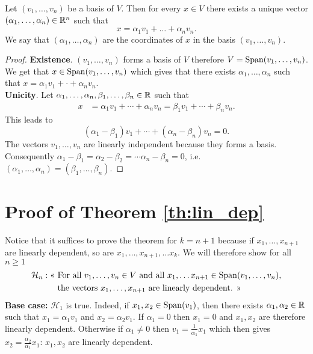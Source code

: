 \documentclass[11pt,nocut]{article}
\begin{document}
\begin{proposition}[Coordinates]
	Let $(v_1, \dots, v_n)$ be a basis of $V$. Then for every $x \in V$ there exists a unique vector $(\alpha_1, \dots, \alpha_n) \in \mathbb{R}^n$ such that
	$$
	x = \alpha_1 v_1 + \dots + \alpha_n v_n.
	$$
	We say that $(\alpha_1, \dots, \alpha_n)$ are the coordinates of $x$ in the basis $(v_1, \dots, v_n)$.
\end{proposition}
\begin{proof}
	\textbf{Existence}. $(v_1, \dots, v_n)$ forms a basis of $V$ therefore  $V = {{\rm Span}}(v_1, \dots, v_n)$. We get that $x \in {{\rm Span}}(v_1, \dots, v_n)$ which gives that there exists $\alpha_1, \dots, \alpha_n$ such that $x = \alpha_1 v_1 + \cdot + \alpha_n v_n$.
	\\
	\textbf{Unicity}. Let $\alpha_1, \dots, \alpha_n, \beta_1, \dots, \beta_n \in \mathbb{R}$ such that
	\begin{align*}
		x &= \alpha_1 v_1 + \cdots + \alpha_n v_n = \beta_1 v_1 + \cdots + \beta_n v_n.
	\end{align*}
	This leads to
	$$
	(\alpha_1 - \beta_1) v_1 + \cdots + (\alpha_n - \beta_n) v_n = 0.
	$$
	The vectors $v_1, \dots, v_n$ are linearly independent because they forms a basis. Consequently $\alpha_1 - \beta_1 = \alpha_2 - \beta_2 = \cdots \alpha_n - \beta_n = 0$, i.e.\ $(\alpha_1, \dots, \alpha_n) = (\beta_1, \dots, \beta_n)$.
\end{proof}


\section{Proof of Theorem \ref{th:lin_dep}}\label{sec:proof_lin_dep}
	Notice that it suffices to prove the theorem for $k = n+1$ because if $x_1, \dots, x_{n+1}$ are linearly dependent, so are $x_1, \dots, x_{n+1}, \dots x_k$. We will therefore show for all $n \geq 1$
	\begin{align*}
		\mathcal{H}_n: \text{<< } &\text{For all } v_1, \dots, v_{n} \in V \ \text{and all } x_{1}, \dots x_{n+1} \in {{\rm Span}}(v_1, \dots, v_n), \\ &\text{the vectors } x_1, \dots, x_{n+1} \ \text{are linearly dependent. >>}
	\end{align*}
	\textbf{Base case:} $\mathcal{H}_1$ is true. Indeed, if $x_1,x_2 \in {{\rm Span}}(v_1)$, then there exists $\alpha_1, \alpha_2 \in \mathbb{R}$ such that $x_1 = \alpha_1 v_1$ and $x_2 = \alpha_2 v_1$. If $\alpha_1 = 0$ then $x_1 = 0$ and $x_1,x_2$ are therefore linearly dependent. 
	Otherwise if $\alpha_1 \neq 0$ then $v_1 = \frac{1}{\alpha_1} x_1$ which then gives $x_2 = \frac{\alpha_2}{\alpha_1} x_1$: $x_1,x_2$ are linearly dependent. 
	\\
\end{document}
